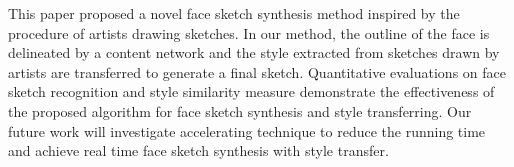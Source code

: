 \documentclass[10pt,twocolumn,letterpaper]{article}
\begin{document}
This paper proposed a novel face sketch synthesis method inspired by the procedure of artists drawing sketches. In our method, the outline of the face is delineated by a content network and the style extracted from sketches drawn by artists are transferred to generate a final sketch. Quantitative evaluations on face sketch recognition and style similarity measure demonstrate the effectiveness of the proposed algorithm for face sketch synthesis and style transferring. Our future work will investigate accelerating technique to reduce the running time and achieve real time face sketch synthesis with style transfer.


{\small


}
\end{document}

